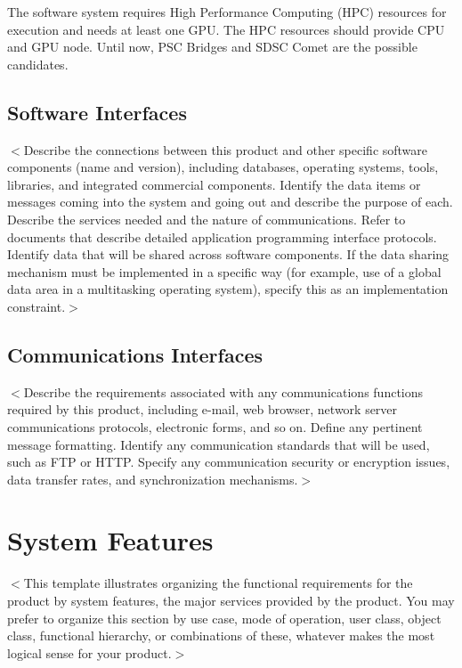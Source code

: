\documentclass{scrreprt}
\begin{document}
The software system requires High Performance Computing (HPC) resources for execution 
and needs at least one GPU. The HPC resources should provide CPU and GPU node. 
Until now, PSC Bridges and SDSC Comet are the possible candidates.

\section{Software Interfaces}
$<$Describe the connections between this product and other specific software 
components (name and version), including databases, operating systems, tools, 
libraries, and integrated commercial components. Identify the data items or 
messages coming into the system and going out and describe the purpose of each.  
Describe the services needed and the nature of communications. Refer to 
documents that describe detailed application programming interface protocols.  
Identify data that will be shared across software components. If the data 
sharing mechanism must be implemented in a specific way (for example, use of a 
global data area in a multitasking operating system), specify this as an 
implementation constraint.$>$


\section{Communications Interfaces}
$<$Describe the requirements associated with any communications functions 
required by this product, including e-mail, web browser, network server 
communications protocols, electronic forms, and so on. Define any pertinent 
message formatting. Identify any communication standards that will be used, such 
as FTP or HTTP. Specify any communication security or encryption issues, data 
transfer rates, and synchronization mechanisms.$>$

\chapter{System Features}
$<$This template illustrates organizing the functional requirements for the 
product by system features, the major services provided by the product. You may 
prefer to organize this section by use case, mode of operation, user class, 
object class, functional hierarchy, or combinations of these, whatever makes the 
most logical sense for your product.$>$
\end{document}
